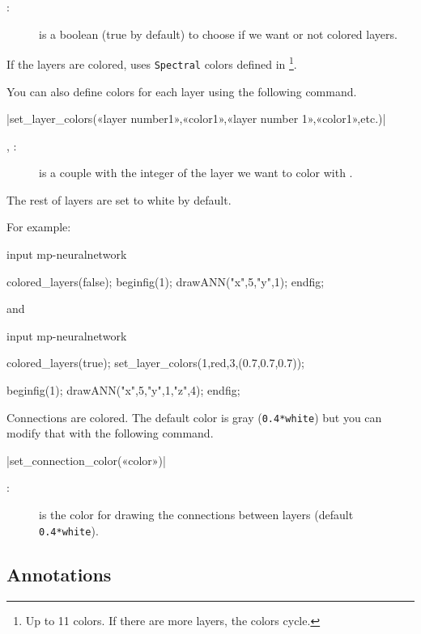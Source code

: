 \documentclass[english]{ltxdoc}
\begin{document}
\begin{description}
  \item[:] is a \MP{} boolean (true by default) to choose if we
  want or not colored layers.
\end{description}

If the layers are colored, \mpneural{} uses \lstinline+Spectral+ colors defined
in \footnote{Up to 11 colors. If there are more layers,
the colors cycle.}. 

You can also define colors for each layer using the following command. 


\commande|set_layer_colors(«layer number1»,«color1»,«layer number 1»,«color1»,etc.)|\smallskip{}

\begin{description}
  \item[, :] is a couple with the integer of
  the layer we want to color with .
\end{description}

The rest of layers are set to white by default.

For example:
\begin{ExempleMP}
input mp-neuralnetwork

colored_layers(false);
beginfig(1);
drawANN("x",5,"y",1);
endfig;
\end{ExempleMP}

and
\begin{ExempleMP}
input mp-neuralnetwork

colored_layers(true);
set_layer_colors(1,red,3,(0.7,0.7,0.7));

beginfig(1);
drawANN("x",5,"y",1,"z",4);
endfig;
\end{ExempleMP}
  
Connections are colored. The default color is gray (\lstinline+0.4*white+) but
you can modify that with the following command. 

\commande|set_connection_color(«color»)|\smallskip{}

\begin{description}
  \item[:] is the color for drawing the connections between layers
  (default \lstinline+0.4*white+).
\end{description}


\subsection{Annotations}
\end{document}
